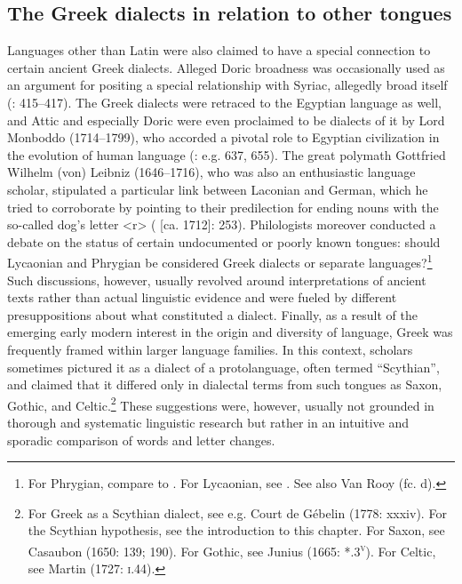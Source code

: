 \documentclass[output=paper]{langsci/langscibook}
\begin{document}
\subsection{The Greek dialects in relation to other tongues}
\hypertarget{Toc19704841}{}
Languages other than Latin were also claimed to have a special connection to certain ancient Greek dialects. Alleged Doric broadness was occasionally used as an argument for positing a special relationship with Syriac, allegedly broad itself (\citealt{Saumaise1643a}: 415–417). The Greek dialects were retraced to the Egyptian language as well, and Attic and especially Doric were even proclaimed to be dialects of it by Lord Monboddo (1714–1799), who accorded a pivotal role to Egyptian civilization in the evolution of human language (\citealt{Monboddo1774}: e.g. 637, 655). The great polymath Gottfried Wilhelm (von) Leibniz (1646–1716), who was also an enthusiastic language scholar, stipulated a particular link between Laconian and German, which he tried to corroborate by pointing to their predilection for ending nouns with the so-called dog’s letter <r> (\citealt{Leibniz1991} [ca. 1712]: 253). Philologists moreover conducted a debate on the status of certain undocumented or poorly known tongues: should Lycaonian and Phrygian be considered Greek dialects or separate languages?\footnote{For Phrygian, compare \citet[465]{Rijcke1684} to \citet[16]{Jablonski1714}. For Lycaonian, see \citet[2]{Jablonski1714}. See also Van Rooy (fc. d).} Such discussions, however, usually revolved around interpretations of ancient texts rather than actual linguistic evidence and were fueled by different presuppositions about what constituted a dialect. Finally, as a result of the emerging early modern interest in the origin and diversity of language, Greek was frequently framed within larger language families. In this context, scholars sometimes pictured it as a dialect of a protolanguage, often termed “Scythian”, and claimed that it differed only in dialectal terms from such tongues as Saxon, Gothic, and Celtic.\footnote{For Greek as a Scythian dialect, see e.g. Court de Gébelin (1778: xxxiv). For the Scythian hypothesis, see the introduction to this chapter. For Saxon, see Casaubon (1650: 139; 190). For Gothic, see Junius (1665: *.3\textsc{\textsuperscript{v}}). For Celtic, see Martin (1727: \textsc{i}.44).} These suggestions were, however, usually not grounded in thorough and systematic linguistic research but rather in an intuitive and sporadic comparison of words and letter changes.
\end{document}
